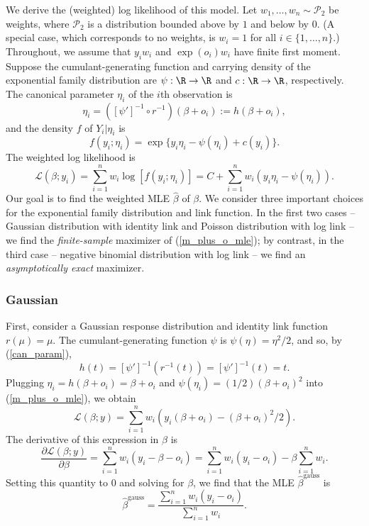 \documentclass[12pt]{article}
\begin{document}
\begin{appendices}
We derive the (weighted) log likelihood of this model. Let $w_1, \dots, w_n \sim \mathcal{P}_2$ be weights, where $\mathcal{P}_2$ is a distribution bounded above by $1$ and below by $0$. (A special case, which corresponds to no weights, is $w_i = 1$ for all $i \in \{1, \dots, n\}$.) Throughout, we assume that $y_iw_i$ and $\exp(o_i)w_i$ have finite first moment.  Suppose the cumulant-generating function and carrying density of the exponential family distribution are $\psi:\R \to \R$ and $c: \R \to \R$, respectively. The canonical parameter $\eta_i$ of the $i$th observation is 
\begin{equation}\label{can_param}
\eta_i = ([\psi']^{-1} \circ r^{-1})(\beta + o_i) := h(\beta + o_i),
\end{equation}
 and the density $f$ of $Y_i | \eta_i$ is
$$f(y_i; \eta_i) = \exp\{y_i \eta_i - \psi(\eta_i) + c(y_i)\}.$$ The weighted log likelihood is
\begin{equation}\label{m_plus_o_mle}
\mathcal{L}(\beta;y_i) = \sum_{i=1}^n w_i\log\left[f(y_i;\eta_i)\right] = C + \sum_{i=1}^n w_i(y_i \eta _i - \psi(\eta_i)).
\end{equation}
Our goal is to find the weighted MLE $\hat{\beta}$ of $\beta$. We consider three important choices for the exponential family distribution and link function. %
In the first two cases -- Gaussian distribution with identity link and Poisson distribution with log link -- we find the \textit{finite-sample} maximizer of (\ref{m_plus_o_mle}); by contrast, in the third case -- negative binomial distribution with log link -- we find an \textit{asymptotically exact} maximizer.

\subsubsection*{Gaussian}
First, consider a Gaussian response distribution and identity link function $r(\mu) = \mu$. The cumulant-generating function $\psi$ is $\psi(\eta) = \eta^2/2$, and so, by (\ref{can_param}),
$$h(t) = [\psi']^{-1}( r^{-1}(t)) = [\psi']^{-1}(t) = t.$$
Plugging $\eta_i = h(\beta + o_i) = \beta + o_i$ and $\psi(\eta_i) = (1/2)(\beta + o_i)^2$ into (\ref{m_plus_o_mle}), we obtain
$$\mathcal{L}(\beta; y) = \sum_{i=1}^n w_i (y_i(\beta + o_i) - (\beta + o_i)^2/2).$$ The derivative of this expression in $\beta$ is
$$\frac{\partial \mathcal{L}(\beta;y)}{\partial\beta} = \sum_{i=1}^n w_i (y_i - \beta - o_i) = \sum_{i=1}^n w_i(y_i - o_i) - \beta \sum_{i=1}^n w_i.$$ Setting this quantity to 0 and solving for $\beta$, we find that the MLE $\hat{\beta}^\textrm{gauss}$ is
$$\hat{\beta}^\textrm{gauss} = \frac{\sum_{i=1}^n w_i (y_i - o_i)}{\sum_{i=1}^n w_i}.$$


\end{appendices}
\end{document}
